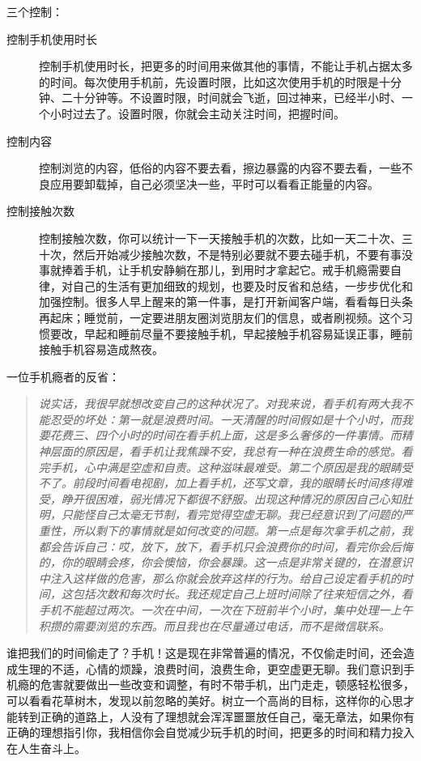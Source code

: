 三个控制：\begin{description}
    \item[控制手机使用时长] 控制手机使用时长，把更多的时间用来做其他的事情，不能让手机占据太多的时间。每次使用手机前，先设置时限，比如这次使用手机的时限是十分钟、二十分钟等。不设置时限，时间就会飞逝，回过神来，已经半小时、一个小时过去了。设置时限，你就会主动关注时间，把握时间。
    \item[控制内容] 控制浏览的内容，低俗的内容不要去看，擦边暴露的内容不要去看，一些不良应用要卸载掉，自己必须坚决一些，平时可以看看正能量的内容。
    \item[控制接触次数] 控制接触次数，你可以统计一下一天接触手机的次数，比如一天二十次、三十次，然后开始减少接触次数，不是特别必要就不要去碰手机，不要有事没事就捧着手机，让手机安静躺在那儿，到用时才拿起它。戒手机瘾需要自律，对自己的生活有更加细致的规划，也要及时反省和总结，一步步优化和加强控制。很多人早上醒来的第一件事，是打开新闻客户端，看看每日头条再起床；睡觉前，一定要进朋友圈浏览朋友们的信息，或者刷视频。这个习惯要改，早起和睡前尽量不要接触手机，早起接触手机容易延误正事，睡前接触手机容易造成熬夜。
\end{description}

一位手机瘾者的反省：

\begin{quote}\it
    说实话，我很早就想改变自己的这种状况了。对我来说，看手机有两大我不能忍受的坏处：第一就是浪费时间。一天清醒的时间假如是十个小时，而我要花费三、四个小时的时间在看手机上面，这是多么奢侈的一件事情。而精神层面的原因是，看手机让我焦躁不安，我总有一种在浪费生命的感觉。看完手机，心中满是空虚和自责。这种滋味最难受。第二个原因是我的眼睛受不了。前段时间看电视剧，加上看手机，还写文章，我的眼睛长时间疼得难受，睁开很困难，弱光情况下都很不舒服。出现这种情况的原因自己心知肚明，只能怪自己太毫无节制，看完觉得空虚无聊。我已经意识到了问题的严重性，所以剩下的事情就是如何改变的问题。第一点是每次拿手机之前，我都会告诉自己：哎，放下，放下，看手机只会浪费你的时间，看完你会后悔的，你的眼睛会疼，你会懊恼，你会暴躁。这一点是非常关键的，在潜意识中注入这样做的危害，那么你就会放弃这样的行为。给自己设定看手机的时间，这包括次数和每次时长。我还规定自己上班时间除了往来短信之外，看手机不能超过两次。一次在中间，一次在下班前半个小时，集中处理一上午积攒的需要浏览的东西。而且我也在尽量通过电话，而不是微信联系。
\end{quote}

谁把我们的时间偷走了？手机！这是现在非常普遍的情况，不仅偷走时间，还会造成生理的不适，心情的烦躁，浪费时间，浪费生命，更空虚更无聊。我们意识到手机瘾的危害就要做出一些改变和调整，有时不带手机，出门走走，顿感轻松很多，可以看看花草树木，发现以前忽略的美好。树立一个高尚的目标，这样你的心思才能转到正确的道路上，人没有了理想就会浑浑噩噩放任自己，毫无章法，如果你有正确的理想指引你，我相信你会自觉减少玩手机的时间，把更多的时间和精力投入在人生奋斗上。

